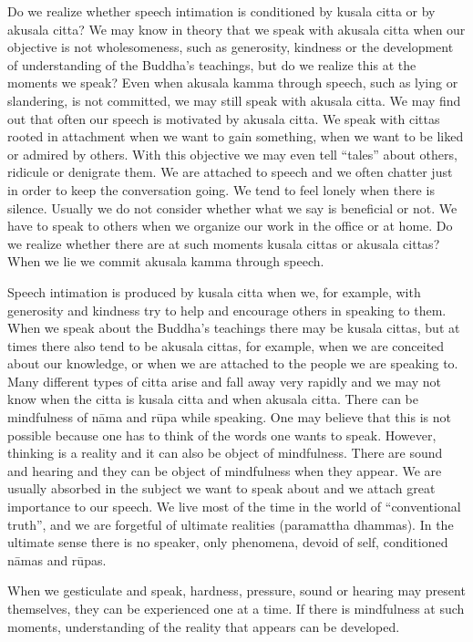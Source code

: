 \documentclass{book}
\begin{document}
Do we realize whether speech intimation is conditioned by kusala citta
or by akusala citta? We may know in theory that we speak with akusala
citta when our objective is not wholesomeness, such as generosity,
kindness or the development of understanding of the Buddha's teachings,
but do we realize this at the moments we speak? Even when akusala kamma
through speech, such as lying or slandering, is not committed, we may
still speak with akusala citta. We may find out that often our speech
is motivated by akusala citta. We speak with cittas rooted in
attachment when we want to gain something, when we want to be liked or
admired by others. With this objective we may even tell ``tales'' about
others, ridicule or denigrate them. We are attached to speech and we
often chatter just in order to keep the conversation going. We tend to
feel lonely when there is silence. Usually we do not consider whether
what we say is beneficial or not. We have to speak to others when we
organize our work in the office or at home. Do we realize whether there
are at such moments kusala cittas or akusala cittas? When we lie we
commit akusala kamma through speech.

Speech intimation is produced by kusala citta when we, for example, with
generosity and kindness try to help and encourage others in speaking to
them. When we speak about the Buddha's teachings there may be kusala
cittas, but at times there also tend to be akusala cittas, for example,
when we are conceited about our knowledge, or when we are attached to
the people we are speaking to. Many different types of citta arise and
fall away very rapidly and we may not know when the citta is kusala
citta and when akusala citta. There can be mindfulness of n{\=a}ma and
r\=upa while speaking. One may believe that this is not possible
because one has to think of the words one wants to speak. However,
thinking is a reality and it can also be object of mindfulness. There
are sound and hearing and they can be object of mindfulness when they
appear. We are usually absorbed in the subject we want to speak about
and we attach great importance to our speech. We live most of the time
in the world of ``conventional truth'', and we are forgetful of
ultimate realities (paramattha dhammas). In the ultimate sense there is
no speaker, only phenomena, devoid of self, conditioned n{\=a}mas and
r\=upas. 

When we gesticulate and speak, hardness, pressure, sound or hearing may
present themselves, they can be experienced one at a time. If there is
mindfulness at such moments, understanding of the reality that appears
can be developed. 
\end{document}
